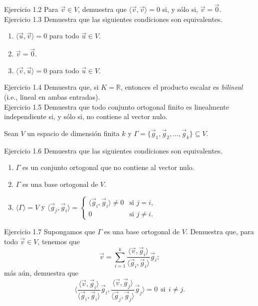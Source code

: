 \documentclass[12pt,dvipsnames]{article}
\numberwithin{equation}{section}
\begin{document}
Ejercicio 1.2 Para $\vec{v}\in V$, demuestra que $\langle \vec{v} , \vec{v} \rangle = 0$ si, y sólo si, $\vec{v}=\vec{0}$. \\

Ejercicio 1.3 Demuestra que las siguientes condiciones son equivalentes. %

\begin{enumerate}[label=(\alph*)]
    \item $\langle \vec{u} , \vec{v} \rangle = 0$ para todo $\vec{u}\in V$.

    \item $\vec{v}=\vec{0}$.

    \item $\langle \vec{v} , \vec{u} \rangle = 0$ para todo $\vec{u}\in V$.
\end{enumerate}

Ejercicio 1.4 Demuestra que, si $K=\mathbb{R}$, entonces el producto escalar es \emph{bilineal} (i.e., lineal en ambas entradas). \\

Ejercicio 1.5 Demuestra que todo conjunto ortogonal finito es linealmente independiente si, y sólo si, no contiene al vector nulo. \\

\begin{center}
Sean $V$ un espacio de dimensión finita $k$ y $\Gamma=\{\vec{g}_1,\vec{g}_2,...,\vec{g}_k\}\subseteq V$.
\end{center}

Ejercicio 1.6 Demuestra que las siguientes condiciones son equivalentes. 

\begin{enumerate}[label=(\alph*)]
    \item $\Gamma$ es un conjunto ortogonal que no contiene al vector nulo.

    \item $\Gamma$ es una base ortogonal de $V$.

    \item $\langle \Gamma \rangle = V$ y $\langle \vec{g}_j , \vec{g}_i \rangle = \begin{cases} \langle \vec{g}_i , \vec{g}_i \rangle \neq 0 &\text{si } j=i, \\ 0 &\text{si } j \neq i. \end{cases}$
\end{enumerate} 

Ejercicio 1.7 Supongamos que $\Gamma$ es una base ortogonal de $V$. Demuestra que, para todo $\vec{v}\in V$, tenemos que
\[
    \vec{v} = \sum_{i=1}^k \frac{\langle \vec{v} , \vec{g}_i \rangle}{\langle \vec{g}_i , \vec{g}_i \rangle} \vec{g}_i;
\] 
\noindent más aún, demuestra que
\[
\bigg\langle \frac{\langle \vec{v} , \vec{g}_i \rangle}{\langle \vec{g}_i , \vec{g}_i \rangle} \vec{g}_i, \frac{\langle \vec{v} , \vec{g}_j \rangle}{\langle \vec{g}_j , \vec{g}_j \rangle} \vec{g}_j \bigg \rangle = 0 \ \ \text{si} \ \ i\neq j.
\] 
\end{document}
